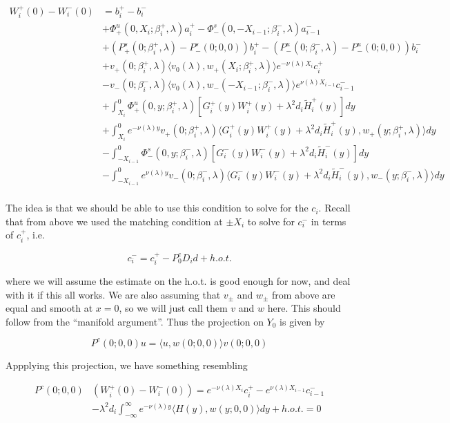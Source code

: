 \documentclass[12pt]{article}
\begin{document}
\begin{align*}
W_i^+(0) - W_i^-(0) &= b_i^+ - b_i^- \\
&+ \Phi^u_+(0, X_i; \beta_i^+, \lambda)a_i^+ - \Phi^s_-(0, -X_{i-1}; \beta_i^-, \lambda)a_{i-1}^- \\
&+(P^s_+(0; \beta_i^+, \lambda) - P^s_-(0; 0, 0))b_i^+  - (P^u_-(0; \beta_i^-, \lambda) - P^u_-(0; 0, 0))b_i^- \\
&+ v_+(0; \beta_i^+, \lambda) \langle v_0(\lambda), w_+(X_i; \beta_i^+, \lambda) \rangle e^{-\nu(\lambda)X_i} c_i^+ \\
&- v_-(0; \beta_i^-, \lambda) \langle v_0(\lambda), w_-(-X_{i-1}; \beta_i^-, \lambda) \rangle e^{\nu(\lambda)X_{i-1}} c_{i-1}^- \\
&+ \int_{X_i}^0 \Phi^u_+(0, y; \beta_i^+, \lambda) [ G_i^+(y)W_i^+(y) + \lambda^2 d_i \tilde{H}_i^+(y) ] dy \\
&+ \int_{X_i}^0 e^{-\nu(\lambda)y} v_+(0; \beta_i^+, \lambda) \langle G_i^+(y)W_i^+(y) + \lambda^2 d_i \tilde{H}_i^+(y), w_+(y; \beta_i^+, \lambda) \rangle dy \\
&- \int_{-X_{i-1}}^0 \Phi^s_-(0, y; \beta_i^-, \lambda) [ G_i^-(y)W_i^-(y) + \lambda^2 d_i \tilde{H}_i^-(y) ] dy \\
&- \int_{-X_{i-1}}^0
e^{\nu(\lambda)y} v_-(0; \beta_i^-, \lambda) \langle G_i^-(y)W_i^-(y) + \lambda^2 d_i \tilde{H}_i^-(y), w_-(y; \beta_i^-, \lambda) \rangle dy \\
\end{align*}

The idea is that we should be able to use this condition to solve for the $c_i$. Recall that from above we used the matching condition at $\pm X_i$ to solve for $c_i^-$ in terms of $c_i^+$, i.e. 

\[
c_i^- = c_i^+ - P_0^c D_i d + h.o.t.
\]

where we will assume the estimate on the h.o.t. is good enough for now, and deal with it if this all works. We are also assuming that $v_\pm$ and $w_\pm$ from above are equal and smooth at $x = 0$, so we will just call them $v$ and $w$ here. This should follow from the ``manifold argument''. Thus the projection on $Y_0$ is given by

\[
P^c(0; 0, 0)u = \langle u, w(0; 0, 0) \rangle v(0; 0, 0)
\]

Appplying this projection, we have something resembling

\begin{align*}
P^c(0; 0, 0)&( W_i^+(0) - W_i^-(0)) = e^{-\nu(\lambda)X_i} c_i^+ - e^{\nu(\lambda)X_{i-1}} c_{i-1}^- \\
&- \lambda^2 d_i \int_{-\infty}^\infty e^{-\nu(\lambda)y} \langle H(y), w(y; 0, 0) \rangle dy + h.o.t.
= 0
\end{align*}
\end{document}
